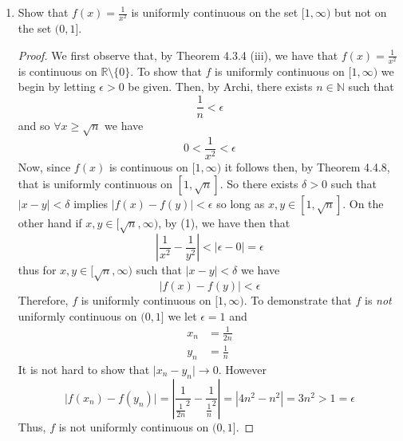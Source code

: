 \begin{enumerate}
\begin{proof}
\begin{enumerate}
        \item Let \( A \subset \mathbb{R} \) be bounded. Thus there exists \( a > 0 \) such that \linebreak \( A \subset [-a,a] \). From (a), we know that \( x^{3} \) is continuous on \( [-a,a] \). Thus, by compactness of \( [-a,a] \) and Theorem 4.4.8, we get that \( x^{3} \) is uniformly continuous on \( [-a, a] \) and therefore on \( A \). 
    \end{enumerate}
    \end{proof}
    
    \item Show that \( f(x) = \frac{1}{x^{2}} \) is uniformly continuous on the set \( [1, \infty ) \) but not on the set \( (0,1]\).
    
    \begin{proof}
    We first observe that, by Theorem 4.3.4 (iii), we have that \( f(x) = \frac{1}{x^{2}} \) is continuous on \( \mathbb{R} \setminus \{0\} \). 
    To show that \( f \) is uniformly continuous on \( [1,\infty) \) we begin by letting \( \epsilon > 0 \) be given. Then, by Archi, there exists \( n \in \mathbb{N} \) such that
    \[
    \frac{1}{n} < \epsilon
    \]
    and so \( \forall x \geq \sqrt{n} \) we have
    \[
    0 < \frac{1}{x^{2}} < \epsilon \tag{1}
    \]
    Now, since \( f(x) \) is continuous on \( [1, \infty) \) it follows then, by Theorem 4.4.8, that is uniformly continuous on \( [1,\sqrt{n}] \). So there exists \( \delta > 0 \) such that \( \vert x-y \vert < \delta \) implies \( \vert f(x) - f(y) \vert < \epsilon \) so long as \( x,y \in [1,\sqrt{n}] \). On the other hand if \( x,y \in [\sqrt{n},\infty) \), by (1), we have then that
    \[
    \left| \frac{1}{x^{2}} - \frac{1}{y^{2}} \right| < \vert \epsilon - 0 \vert = \epsilon
    \]
    thus for \( x,y \in [\sqrt{n}, \infty) \) such that \( \vert x-y \vert < \delta \) we have
    \[
    \vert f(x) - f(y) \vert < \epsilon
    \]
    Therefore, \( f \) is uniformly continuous on \( [1,\infty) \). To demonstrate that \( f \) is \emph{not} uniformly continuous on \( (0,1] \) we let \( \epsilon = 1 \) and
    \begin{align*}
        x_{n} &= \frac{1}{2n} \\
        y_{n} &= \frac{1}{n}
    \end{align*}
    It is not hard to show that \( \vert x_{n} - y_{n} \vert \rightarrow 0 \). However
    \[
    \vert f(x_{n}) - f(y_{n}) \vert = \left| \frac{1}{\frac{1}{2n}^{2}} - \frac{1}{\frac{1}{n}^{2}} \right| = \left| 4n^{2}-n^{2} \right| = 3n^{2} > 1 = \epsilon
    \]
    Thus, \( f \) is not uniformly continuous on \( (0,1] \). 
    \end{proof}
    

\end{enumerate}
